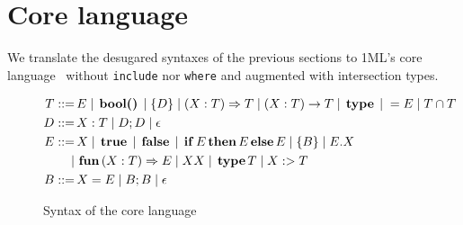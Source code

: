 \documentclass[a4paper,11pt]{article}
\newcommand{\kw}[1]{%
  \,\text{\textbf{#1}}\,
}
\newcommand{\pipe}{%
\; | \;
}
\begin{document}
\section{Core language}
We translate the desugared syntaxes of the previous sections to 1ML's core
language~\cite{rossberg20181ml} without \texttt{include} nor \texttt{where} and
augmented with intersection types.
\begin{figure}[h]
  \begin{align*}
    T ::=&\, E \pipe \kw{bool()} \pipe \{D\} \pipe (X:T)\Rightarrow T \pipe
    (X:T)\rightarrow T \pipe \kw{type} \pipe =E \pipe T \cap T\\
    D ::=&\,X:T \pipe D;D\pipe \epsilon \\
    E ::=&\, X \pipe \kw{true} \pipe \kw{false} \pipe \kw{if} E
    \kw{then} E \kw{else} E \pipe \{B\} \pipe E.X\\
    |&\,\kw{fun} (X:T)\Rightarrow E \pipe X X \pipe \kw{type} T \pipe X :> T\\
    B ::=&\, X=E \pipe B ; B \pipe \epsilon
  \end{align*}
  \caption{Syntax of the core language}
\end{figure}
\printbibliography
\end{document}
